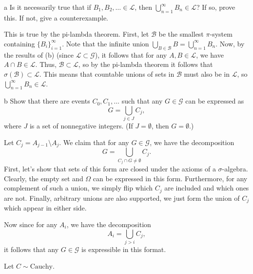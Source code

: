 \documentclass{pset}
\begin{document}
\begin{parts}

\begin{part}{a}
Is it necessarily true that if $B_1,B_2,\ldots \in \mathcal{L}$, then $\bigcup \limits_{n=1}^{\infty} B_n \in \mathcal{L}$? If so, prove this. If not, give a counterexample.
\end{part}

This is true by the pi-lambda theorem. First, let $\mathcal{B}$ be the smallest $\pi$-system containing $\{B_i\}_{i=1}^\infty$. Note that the infinite union $\bigcup_{B\in \mathcal{B}} B = \bigcup^\infty_{n=1} B_n$. Now, by the results of (b) (since $\mathcal{L}\subset \mathcal{G}$), it follows that for any $A,B\in \mathcal{L}$, we have $A\cap B\in \mathcal{L}$. Thus, $\mathcal{B}\subset \mathcal{L}$, so by the pi-lambda theorem it follows that $\sigma(\mathcal{B}) \subset \mathcal{L}$. This means that countable unions of sets in $\mathcal{B}$ must also be in $\mathcal{L}$, so $\bigcup^\infty_{n=1} B_n\in \mathcal{L}$.

\begin{part}{b} Show that there are events $C_0,C_1,\dots$ such that any $G \in \mathcal{G}$ can be expressed as 
$$ G = \bigcup_{j \in J} C_j,$$
where $J$ is a set of nonnegative integers. (If $J = \emptyset$, then $G = \emptyset$.)
\end{part}

Let $C_j = A_{j-1}\setminus A_j$. We claim that for any $G\in \mathcal{G}$, we have the decomposition
\[
    G = \bigcup_{C_j \cap G \neq \emptyset} C_j.
\]
First, let's show that sets of this form are closed under the axioms of a $\sigma$-algebra. Clearly, the empty set and $\Omega$ can be expressed in this form. Furthermore, for any complement of such a union, we simply flip which $C_j$ are included and which ones are not. Finally, arbitrary unions are also supported, we just form the union of $C_j$ which appear in either side.

Now since for any $A_i$, we have the decomposition
\[
  A_i = \bigcup_{j> i} C_j,
\]
it follows that any $G\in \mathcal{G}$ is expressible in this format.
\end{parts}

\begin{problem}{2} Let $C \sim \textrm{Cauchy}$.\end{problem}
\end{document}
